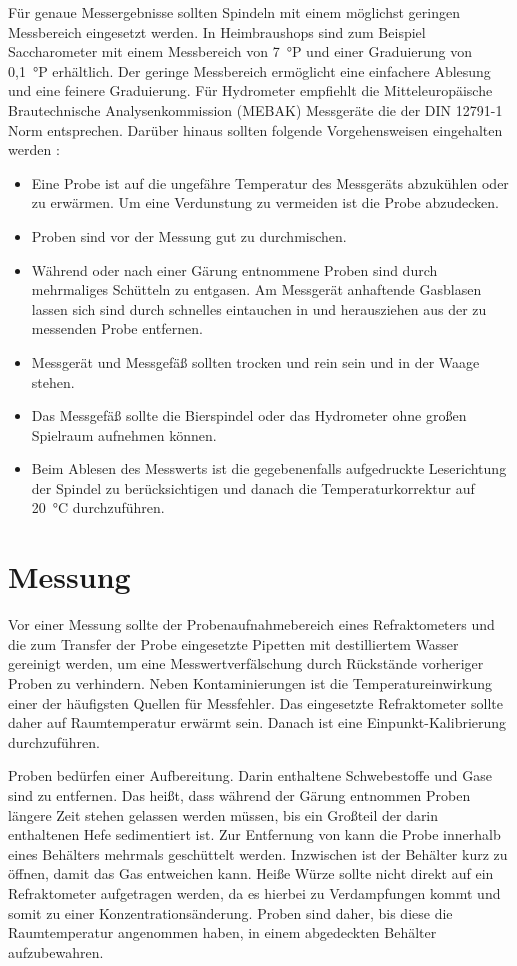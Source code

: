 \documentclass[a4paper,parskip=half]{scrartcl}
\begin{document}
Für genaue Messergebnisse sollten Spindeln mit einem möglichst
geringen Messbereich eingesetzt werden. In Heimbraushops sind
zum Beispiel Saccharometer mit einem Messbereich von 7~°P
und einer Graduierung von 0,1~°P erhältlich. Der geringe Messbereich
ermöglicht eine einfachere Ablesung und eine feinere Graduierung.
Für Hydrometer empfiehlt die Mitteleuropäische Brautechnische
Analysenkommission (MEBAK) Messgeräte die der DIN 12791-1 Norm
entsprechen. Darüber hinaus sollten folgende Vorgehensweisen
eingehalten werden \autocite{Kunze2004,MEBAK2013,Narziss2009,Wolf2015}:

\begin{itemize}
\item Eine Probe ist auf die ungefähre Temperatur des
Messgeräts abzukühlen oder zu erwärmen. Um eine Verdunstung
zu vermeiden ist die Probe abzudecken.
\item Proben sind vor der Messung gut zu durchmischen.
\item Während oder nach einer Gärung entnommene Proben sind
durch mehrmaliges Schütteln zu entgasen. Am Messgerät
anhaftende Gasblasen lassen sich sind durch schnelles eintauchen
in und herausziehen aus der zu messenden Probe entfernen.
\item Messgerät und Messgefäß sollten trocken und rein sein
und in der Waage stehen.
\item Das Messgefäß sollte die Bierspindel oder das Hydrometer
ohne großen Spielraum aufnehmen können.
\item Beim Ablesen des Messwerts ist die gegebenenfalls aufgedruckte
Leserichtung der Spindel zu berücksichtigen und danach die
Temperaturkorrektur auf 20~°C durchzuführen.
\end{itemize}

\section*{Messung}

Vor einer Messung sollte der Probenaufnahmebereich eines Refraktometers
und die zum Transfer der Probe eingesetzte Pipetten mit destilliertem Wasser
gereinigt werden, um eine Messwertverfälschung durch Rückstände vorheriger
Proben zu verhindern. Neben Kontaminierungen ist die Temperatureinwirkung
einer der häufigsten Quellen für Messfehler. Das eingesetzte Refraktometer
sollte daher auf Raumtemperatur erwärmt sein. Danach ist eine 
Einpunkt-Kalibrierung durchzuführen. \autocite{Depalma2017}

Proben bedürfen einer Aufbereitung. Darin enthaltene Schwebestoffe und
Gase sind zu entfernen. Das heißt, dass
während der Gärung entnommen Proben längere Zeit stehen gelassen werden
müssen, bis ein Großteil der darin enthaltenen Hefe sedimentiert
ist. Zur Entfernung von  kann die Probe innerhalb eines
Behälters mehrmals geschüttelt werden. Inzwischen ist der Behälter
kurz zu öffnen, damit das Gas entweichen kann. Heiße Würze
sollte nicht direkt auf ein Refraktometer aufgetragen werden,
da es hierbei zu Verdampfungen kommt und somit zu einer
Konzentrationsänderung. Proben sind daher,
bis diese die Raumtemperatur angenommen haben, in einem abgedeckten
Behälter aufzubewahren. \autocite{Gamer1959,MEBAK2013,Terrill2013}
\end{document}
